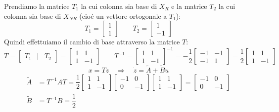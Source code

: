 \documentclass[../main.tex]{subfiles}
\begin{document}
\begin{mdframed}[style=Exercise]
\begin{Exercise}[title={Calcolo di $ X_R $ e decomposizione di raggiungibilit\'a}, difficulty=1]
				Prendiamo la matrice $ T_1 $ la cui colonna sia base di $ X_R $ e la matrice $ T_2 $ la cui colonna sia base di $ X_{NR} $ (cio\'e un vettore ortogonale a $ T_1 $):
				\[
					T_1=
					\begin{bmatrix}
						1\\
						1
					\end{bmatrix} \qquad
					T_2=
					\begin{bmatrix}
						1\\
						-1
					\end{bmatrix}
				\]
				Quindi effettuiamo il cambio di base attraverso la matrice $ T $:
				\[
					T =
					\begin{bmatrix}
						T_1 & | & T_2	
					\end{bmatrix} =
					\begin{bmatrix}
						1 & 1\\
						1 & -1
					\end{bmatrix}\qquad
					T^{-1} =
					\begin{bmatrix}
						1 & 1\\
						1 & -1
					\end{bmatrix}^{-1} = -\dfrac{1}{2}
					\begin{bmatrix}
						-1 & -1\\
						-1 & 1
					\end{bmatrix}= \dfrac{1}{2}
					\begin{bmatrix}
						1 & 1\\
						1 & -1
					\end{bmatrix}
				\]
				\[ 
					x = Tz \quad\Rightarrow\quad \dot z = \tilde A + \tilde B u 
				\]
				\begin{align*}
					\tilde A &= T^{-1}AT = \dfrac{1}{2}
					\begin{bmatrix}
						1 & 1\\
						1 & -1
					\end{bmatrix}
					\begin{bmatrix}
						-1 & 0\\
						0 & -1
					\end{bmatrix}
					\begin{bmatrix}
						1 & 1\\
						1 & -1
					\end{bmatrix} =
					\begin{bmatrix}
						-1 & 0\\
						0 & -1
					\end{bmatrix}\\
					\tilde B &= T^{-1}B = \dfrac{1}{2}

\end{align*}
\end{Exercise}
\end{mdframed}
\end{document}
